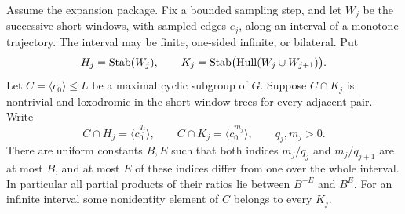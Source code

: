 \begin{lemma}\label{gate:cyclic-indices}
Assume the expansion package. Fix a bounded sampling step, and let
\(W_j\) be the successive short windows, with sampled edges \(e_j\),
along an interval of a monotone trajectory. The interval may
be finite, one-sided infinite, or bilateral. Put
\[
 H_j=\operatorname{Stab}(W_j),\qquad
 K_j=\operatorname{Stab}\bigl(\operatorname{Hull}(W_j\cup W_{j+1})\bigr).
\]
Let \(C=\langle c_0\rangle\le L\) be a maximal cyclic subgroup of
\(G\). Suppose \(C\cap K_j\) is nontrivial and loxodromic in the
short-window trees for every adjacent pair. Write
\[
 C\cap H_j=\langle c_0^{q_j}\rangle,\qquad
 C\cap K_j=\langle c_0^{m_j}\rangle,
 \qquad q_j,m_j>0.
\]
There are uniform constants \(B,E\) such that both indices
\(m_j/q_j\) and \(m_j/q_{j+1}\) are at most \(B\), and at most
\(E\) of these indices differ from one over the whole interval.
In particular all partial products of their ratios lie between
\(B^{-E}\) and \(B^E\). For an infinite interval some nonidentity
element of \(C\) belongs to every \(K_j\).
\end{lemma}
